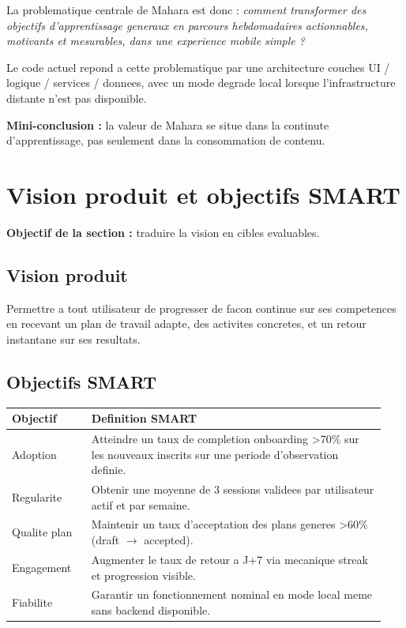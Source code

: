 \documentclass[12pt,a4paper]{article}
\begin{document}
La problematique centrale de Mahara est donc : \textit{comment transformer des objectifs d'apprentissage generaux en parcours hebdomadaires actionnables, motivants et mesurables, dans une experience mobile simple ?}

Le code actuel repond a cette problematique par une architecture couches UI / logique / services / donnees, avec un mode degrade local lorsque l'infrastructure distante n'est pas disponible.

\textbf{Mini-conclusion :} la valeur de Mahara se situe dans la continute d'apprentissage, pas seulement dans la consommation de contenu.

\section{Vision produit et objectifs SMART}
\textbf{Objectif de la section :} traduire la vision en cibles evaluables.

\subsection{Vision produit}
Permettre a tout utilisateur de progresser de facon continue sur ses competences en recevant un plan de travail adapte, des activites concretes, et un retour instantane sur ses resultats.

\subsection{Objectifs SMART}
\begin{longtable}{p{0.2\linewidth}p{0.74\linewidth}}
\toprule
\textbf{Objectif} & \textbf{Definition SMART} \\
\midrule
Adoption & Atteindre un taux de completion onboarding \textgreater 70\% sur les nouveaux inscrits sur une periode d'observation definie. \\
Regularite & Obtenir une moyenne de 3 sessions validees par utilisateur actif et par semaine. \\
Qualite plan & Maintenir un taux d'acceptation des plans generes \textgreater 60\% (draft $\rightarrow$ accepted). \\
Engagement & Augmenter le taux de retour a J+7 via mecanique streak et progression visible. \\
Fiabilite & Garantir un fonctionnement nominal en mode local meme sans backend disponible. \\
\bottomrule
\end{longtable}
\end{document}
